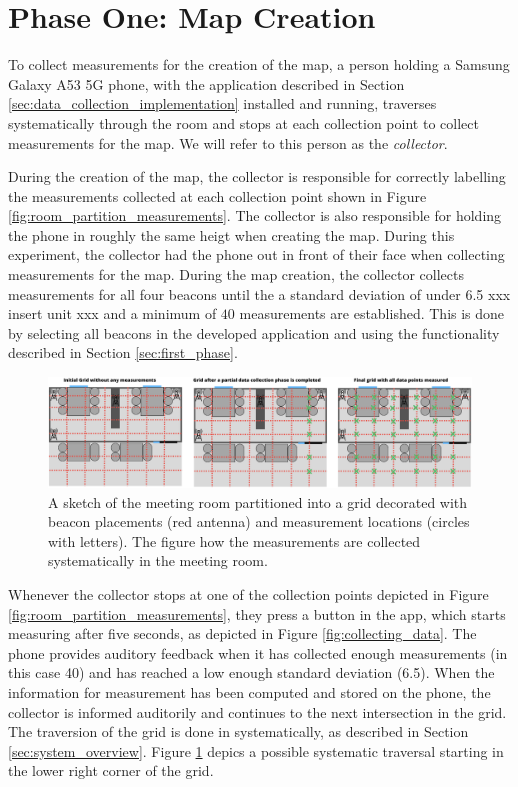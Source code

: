 \section{Phase One: Map Creation}\label{sec:eval_phase1}
To collect measurements for the creation of the map, a person holding a Samsung Galaxy A53 5G phone, with the application described in Section \ref{sec:data_collection_implementation} installed and running, traverses systematically through the room and stops at each collection point to collect measurements for the map. 
We will refer to this person as the \textit{collector}.

During the creation of the map, the collector is responsible for correctly labelling the measurements collected at each collection point shown in Figure \ref{fig:room_partition_measurements}. 
The collector is also responsible for holding the phone in roughly the same heigt when creating the map. 
During this experiment, the collector had the phone out in front of their face when collecting measurements for the map. 
During the map creation, the collector collects measurements for all four beacons until the a standard deviation of under 6.5 xxx insert unit xxx and a minimum of $40$ measurements are established.
This is done by selecting all beacons in the developed application and using the functionality described in Section \ref{sec:first_phase}.

\begin{figure}[h]
    \centering
    \includegraphics[width=\textwidth]{images/experiment_map_creation.png}
    \caption{A sketch of the meeting room partitioned into a grid decorated with beacon placements (red antenna) and measurement locations (circles with letters). The figure how the measurements are collected systematically in the meeting room.}
    \label{fig:experiment_map_creation}
\end{figure}
Whenever the collector stops at one of the collection points depicted in Figure \ref{fig:room_partition_measurements}, they press a button in the app, which starts measuring after five seconds, as depicted in Figure \ref{fig:collecting_data}.
The phone provides auditory feedback when it has collected enough measurements (in this case 40) and has reached a low enough standard deviation (6.5).
When the information for measurement has been computed and stored on the phone, the collector is informed auditorily and continues to the next intersection in the grid. 
The traversion of the grid is done in systematically, as described in Section \ref{sec:system_overview}. 
Figure \ref{fig:experiment_map_creation} depics a possible systematic traversal starting in the lower right corner of the grid. 


